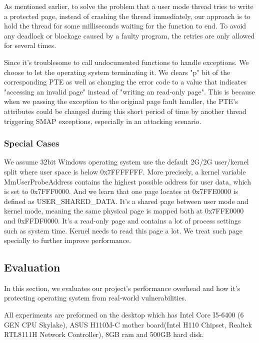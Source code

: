 As mentioned earlier, to solve the problem that a user mode thread tries to write a protected page, instead of crashing the thread immediately, our approach is to hold the thread for some milliseconds waiting for the function to end. To avoid any deadlock or blockage caused by a faulty program, the retries are only allowed for several times. 

Since it's troublesome to call undocumented functions to handle exceptions. We choose to let the operating system terminating it. We clears "p" bit of the corresponding PTE as well as changing the error code to a value that indicates "accessing an invalid page" instead of "writing an read-only page". This is because when we passing the exception to the original page fault handler, the PTE's attributes could be changed during this short period of time by another thread triggering SMAP exceptions, especially in an attacking scenario. 




\subsubsection{Special Cases}
We assume 32bit Windows operating system use the default 2G/2G user/kernel split where user space is below 0x7FFFFFFF. More precisely, a kernel variable MmUserProbeAddress contains the highest possible address for user data, which is set to 0x7FFF0000. And we learn that one page locates at 0x7FFE0000 is defined as USER\_SHARED\_DATA. It's a shared page between user mode and kernel mode, meaning the same physical page is mapped both at 0x7FFE0000 and 0xFFDF0000. It's a read-only page and contains a lot of process settings such as system time. Kernel needs to read this page a lot. We treat such page specially to further improve performance. 


\subsection{Evaluation}

In this section, we evaluates our project's performance overhead and how it's protecting operating system from real-world vulnerabilities.

All experiments are preformed on the desktop which has Intel Core I5-6400 (6 GEN CPU Skylake), ASUS H110M-C mother board(Intel H110 Chipset, Realtek RTL8111H Network Controller), 8GB ram and 500GB hard disk.

